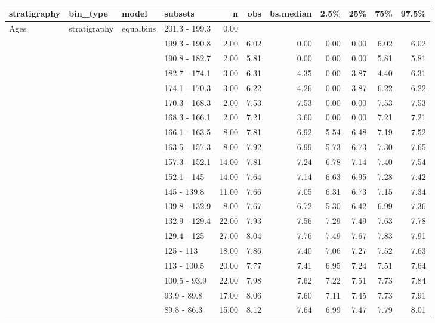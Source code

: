 \begin{longtable}{llllrrrrrrr}
  \hline
stratigraphy & bin\_type & model & subsets & n & obs & bs.median & 2.5\% & 25\% & 75\% & 97.5\% \\ 
  \hline
Ages & stratigraphy & equalbins & 201.3 - 199.3 & 0.00 &  &  &  &  &  &  \\ 
   &  &  & 199.3 - 190.8 & 2.00 & 6.02 & 0.00 & 0.00 & 0.00 & 6.02 & 6.02 \\ 
   &  &  & 190.8 - 182.7 & 2.00 & 5.81 & 0.00 & 0.00 & 0.00 & 5.81 & 5.81 \\ 
   &  &  & 182.7 - 174.1 & 3.00 & 6.31 & 4.35 & 0.00 & 3.87 & 4.40 & 6.31 \\ 
   &  &  & 174.1 - 170.3 & 3.00 & 6.22 & 4.26 & 0.00 & 3.87 & 6.22 & 6.22 \\ 
   &  &  & 170.3 - 168.3 & 2.00 & 7.53 & 7.53 & 0.00 & 0.00 & 7.53 & 7.53 \\ 
   &  &  & 168.3 - 166.1 & 2.00 & 7.21 & 3.60 & 0.00 & 0.00 & 7.21 & 7.21 \\ 
   &  &  & 166.1 - 163.5 & 8.00 & 7.81 & 6.92 & 5.54 & 6.48 & 7.19 & 7.52 \\ 
   &  &  & 163.5 - 157.3 & 8.00 & 7.92 & 6.99 & 5.73 & 6.73 & 7.30 & 7.65 \\ 
   &  &  & 157.3 - 152.1 & 14.00 & 7.81 & 7.24 & 6.78 & 7.14 & 7.40 & 7.54 \\ 
   &  &  & 152.1 - 145 & 14.00 & 7.64 & 7.14 & 6.63 & 6.95 & 7.28 & 7.42 \\ 
   &  &  & 145 - 139.8 & 11.00 & 7.66 & 7.05 & 6.31 & 6.73 & 7.15 & 7.34 \\ 
   &  &  & 139.8 - 132.9 & 8.00 & 7.67 & 6.72 & 5.30 & 6.42 & 6.99 & 7.36 \\ 
   &  &  & 132.9 - 129.4 & 22.00 & 7.93 & 7.56 & 7.29 & 7.49 & 7.63 & 7.78 \\ 
   &  &  & 129.4 - 125 & 27.00 & 8.04 & 7.76 & 7.49 & 7.67 & 7.83 & 7.91 \\ 
   &  &  & 125 - 113 & 18.00 & 7.86 & 7.40 & 7.06 & 7.27 & 7.52 & 7.63 \\ 
   &  &  & 113 - 100.5 & 20.00 & 7.77 & 7.41 & 6.95 & 7.24 & 7.51 & 7.64 \\ 
   &  &  & 100.5 - 93.9 & 22.00 & 7.98 & 7.62 & 7.22 & 7.51 & 7.73 & 7.84 \\ 
   &  &  & 93.9 - 89.8 & 17.00 & 8.06 & 7.60 & 7.11 & 7.45 & 7.73 & 7.91 \\ 
   &  &  & 89.8 - 86.3 & 15.00 & 8.12 & 7.64 & 6.99 & 7.47 & 7.79 & 8.01 \\ 

\end{longtable}
